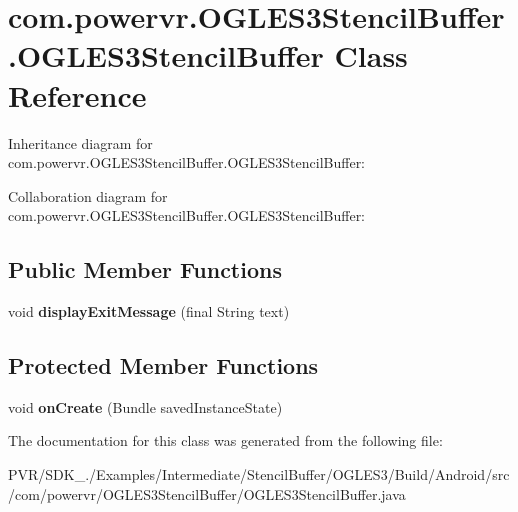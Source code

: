 \hypertarget{classcom_1_1powervr_1_1_o_g_l_e_s3_stencil_buffer_1_1_o_g_l_e_s3_stencil_buffer}{\section{com.\+powervr.\+O\+G\+L\+E\+S3\+Stencil\+Buffer.\+O\+G\+L\+E\+S3\+Stencil\+Buffer Class Reference}
\label{classcom_1_1powervr_1_1_o_g_l_e_s3_stencil_buffer_1_1_o_g_l_e_s3_stencil_buffer}
}


Inheritance diagram for com.\+powervr.\+O\+G\+L\+E\+S3\+Stencil\+Buffer.\+O\+G\+L\+E\+S3\+Stencil\+Buffer\+:


Collaboration diagram for com.\+powervr.\+O\+G\+L\+E\+S3\+Stencil\+Buffer.\+O\+G\+L\+E\+S3\+Stencil\+Buffer\+:
\subsection*{Public Member Functions}
\begin{DoxyCompactItemize}
\item 
\hypertarget{classcom_1_1powervr_1_1_o_g_l_e_s3_stencil_buffer_1_1_o_g_l_e_s3_stencil_buffer_aa6a861b9fffd0cde8a283f34b083bf3a}{void {\bfseries display\+Exit\+Message} (final String text)}\label{classcom_1_1powervr_1_1_o_g_l_e_s3_stencil_buffer_1_1_o_g_l_e_s3_stencil_buffer_aa6a861b9fffd0cde8a283f34b083bf3a}

\end{DoxyCompactItemize}
\subsection*{Protected Member Functions}
\begin{DoxyCompactItemize}
\item 
\hypertarget{classcom_1_1powervr_1_1_o_g_l_e_s3_stencil_buffer_1_1_o_g_l_e_s3_stencil_buffer_a71600774451c13a56af55fbc37af4642}{void {\bfseries on\+Create} (Bundle saved\+Instance\+State)}\label{classcom_1_1powervr_1_1_o_g_l_e_s3_stencil_buffer_1_1_o_g_l_e_s3_stencil_buffer_a71600774451c13a56af55fbc37af4642}

\end{DoxyCompactItemize}


The documentation for this class was generated from the following file\+:\begin{DoxyCompactItemize}
\item 
P\+V\+R/\+S\+D\+K\+\_./\+Examples/\+Intermediate/\+Stencil\+Buffer/\+O\+G\+L\+E\+S3/\+Build/\+Android/src/com/powervr/\+O\+G\+L\+E\+S3\+Stencil\+Buffer/O\+G\+L\+E\+S3\+Stencil\+Buffer.\+java\end{DoxyCompactItemize}
